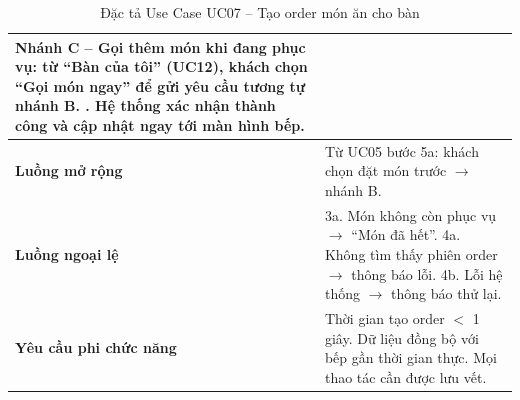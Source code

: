 ﻿\documentclass[../DoAn.tex]{subfiles}
\begin{document}
\begin{table}[H]
\begin{tabular}{|p{4cm}|p{10.2cm}|}
Nhánh C -- Gọi thêm món khi đang phục vụ: từ ``Bàn của tôi'' (UC12), khách chọn ``Gọi món ngay'' để gửi yêu cầu tương tự nhánh B. \newline
5. Hệ thống xác nhận thành công và cập nhật ngay tới màn hình bếp.
\\ \hline
\textbf{Luồng mở rộng} &
Từ UC05 bước 5a: khách chọn đặt món trước $\rightarrow$ nhánh B.
\\ \hline
\textbf{Luồng ngoại lệ} &
3a. Món không còn phục vụ $\rightarrow$ ``Món đã hết''. \newline
4a. Không tìm thấy phiên order $\rightarrow$ thông báo lỗi. \newline
4b. Lỗi hệ thống $\rightarrow$ thông báo thử lại.
\\ \hline
\textbf{Yêu cầu phi chức năng} &
Thời gian tạo order $<$ 1 giây. Dữ liệu đồng bộ với bếp gần thời gian thực. Mọi thao tác cần được lưu vết.
\\ \hline
\end{tabular}
\caption{Đặc tả Use Case UC07 – Tạo order món ăn cho bàn}
\end{table}
\end{document}
